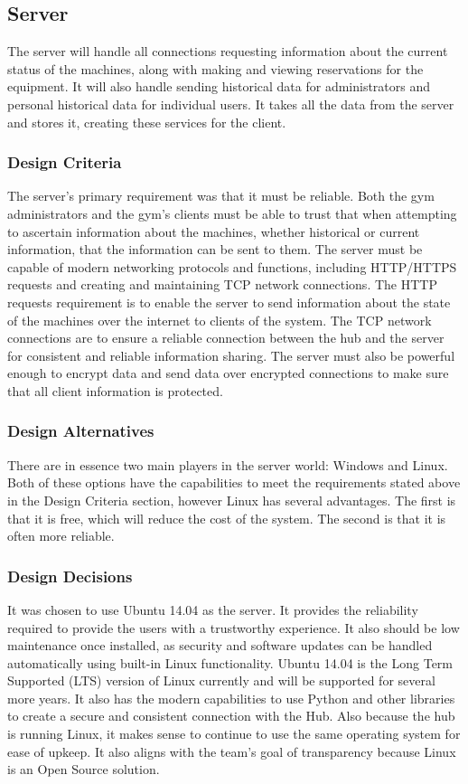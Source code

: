 \documentclass[PPFS.tex]{template/subfiles}
\begin{document}
\subsection{Server}
The server will handle all connections requesting information about the current status of the machines, along with making and viewing reservations for the equipment. It will also handle sending historical data for administrators and personal historical data for individual users. It takes all the data from the server and stores it, creating these services for the client.

\subsubsection{Design Criteria}
The server's primary requirement was that it must be reliable. Both the gym administrators and the gym's clients must be able to trust that when attempting to ascertain information about the machines, whether historical or current information, that the information can be sent to them. The server must be capable of modern networking protocols and functions, including HTTP/HTTPS requests and creating and maintaining TCP network connections. The HTTP requests requirement is to enable the server to send information about the state of the machines over the internet to clients of the system. The TCP network connections are to ensure a reliable connection between the hub and the server for consistent and reliable information sharing. The server must also be powerful enough to encrypt data and send data over encrypted connections to make sure that all client information is protected.

\subsubsection{Design Alternatives}
There are in essence two main players in the server world: Windows and Linux. Both of these options have the capabilities to meet the requirements stated above in the Design Criteria section, however Linux has several advantages. The first is that it is free, which will reduce the cost of the system. The second is that it is often more
reliable.

\subsubsection{Design Decisions}
It was chosen to use Ubuntu 14.04 as the server. It provides the reliability required to provide the users with a trustworthy experience. It also should be low maintenance once installed, as security and software updates can be handled automatically using built-in Linux functionality. Ubuntu 14.04 is the Long Term Supported (LTS) version of Linux currently and will be supported for
several more years. It also has the modern capabilities to use Python and other libraries to create a secure and consistent connection with the Hub. Also because the hub is running Linux, it makes sense to continue to use the same operating system for ease of upkeep. It also aligns with the team's goal of transparency because Linux is an Open Source solution.
\end{document}
